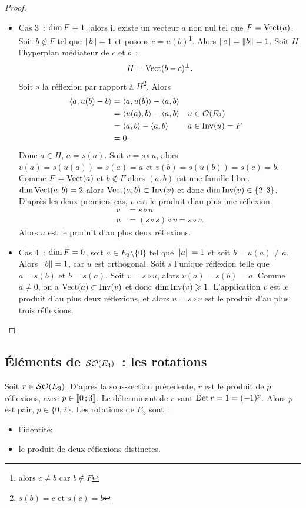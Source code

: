 \begin{proof}
\begin{itemize}
  \item Cas 3~: $\operatorname{dim} F=1$, alors il existe un vecteur $a$ non nul tel que $F=\operatorname{Vect}(a)$. Soit $b \notin F$ tel que $\left\lVert b\right\rVert=1$ et posons $c=u(b)$\footnote{alors $c\neq b$ car $b \notin F$}. Alors $\left\lVert c\right\rVert=\left\lVert b\right\rVert=1$. Soit $H$ l'hyperplan médiateur de $c$ et $b$~:
    \begin{equation}
      H = \operatorname{Vect}(b-c)^\perp.
    \end{equation}
    Soit $s$ la réflexion par rapport à $H$\footnote{$s(b)=c$ et $s(c)=b$}. Alors
    \begin{align}
      \left\langle{a},{u(b)-b}\right\rangle &=\left\langle{a},{u(b)}\right\rangle - \left\langle{a},{b}\right\rangle \\
      &=\left\langle{u(a)},{b}\right\rangle - \left\langle{a},{b}\right\rangle && u \in \mathcal{O}\!\left(E_3\right)\\
      &=\left\langle{a},{b}\right\rangle - \left\langle{a},{b}\right\rangle && a \in \operatorname{Inv}(u)=F \\
      &=0.
    \end{align}
    Donc $a \in H$, $a=s(a)$. Soit $v=s \circ u$, alors $v(a)=s(u(a))=s(a)=a$ et $v(b)=s(u(b))=s(c)=b$. Comme $F=\operatorname{Vect}(a)$ et $b \notin F$ alors $(a,b)$ est une famille libre. $\operatorname{dim} \operatorname{Vect}(a,b)=2$ alors $\operatorname{Vect}(a,b) \subset \operatorname{Inv}(v)$ et donc $\operatorname{dim}\operatorname{Inv}(v) \in \{2,3\}$. D'après les deux premiers cas, $v$ est le produit d'au plus une réflexion.
    \begin{align}
      v &=s \circ u \\
      u &=(s \circ s) \circ v = s \circ v.
    \end{align}
    Alors $u$ est le produit d'au plus deux réflexions.
  \item Cas 4~: $\operatorname{dim} F=0$, soit $a \in E_3 \setminus \{0\}$ tel que $\left\lVert a\right\rVert=1$ et soit $b=u(a)\neq a$. Alors $\left\lVert b\right\rVert=1$, car $u$ est orthogonal. Soit $s$ l'unique réflexion telle que $a=s(b)$ et $b=s(a)$. Soit $v=s \circ u$, alors $v(a)=s(b)=a$. Comme $a \neq 0$, on a $\operatorname{Vect}(a) \subset \operatorname{Inv}(v)$ et donc $\operatorname{dim} \operatorname{Inv}(v) \geqslant 1$. L'application $v$ est le produit d'au plus deux réflexions, et alors $u=s \circ v$ est le produit d'au plus trois réflexions.
  \end{itemize}
\end{proof}

\subsection{Éléments de $\mathcal{SO}\!\left(E_3\right)$~: les rotations}

Soit $r \in \mathcal{SO}\!\left(E_3\right)$. D'après la sous-section précédente, $r$ est le produit de $p$ réflexions, avec $p \in \mathopen{\llbracket}0\mathclose{}\mathpunct{};3\mathclose{\rrbracket}$. Le déterminant de $r$ vaut $\operatorname{Det} r =1=(-1)^p$. Alors $p$ est pair, $p \in \{0,2\}$. Les rotations de $E_3$ sont~:
\begin{itemize}
\item l'identité;
\item le produit de deux réflexions distinctes.
\end{itemize}

